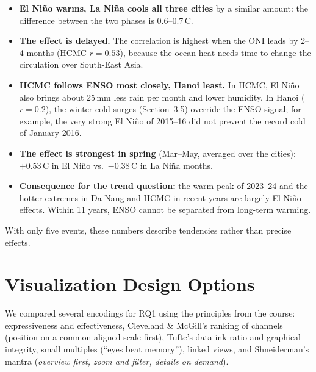 \documentclass[11pt,a4paper]{article}
\begin{document}
\begin{itemize}
    \item \textbf{El Niño warms, La Niña cools all three cities} by a similar amount: the difference between the two phases is 0.6--0.7\,\textdegree C.
    \item \textbf{The effect is delayed.} The correlation is highest when the ONI leads by 2--4 months (HCMC $r=0.53$), because the ocean
    heat needs time to change the circulation over South-East Asia.
    \item \textbf{HCMC follows ENSO most closely, Hanoi least.} In HCMC, El Niño also brings about 25\,mm less rain per month and lower
    humidity. In Hanoi ($r=0.2$), the winter cold surges (Section~3.5) override the ENSO signal; for example, the very strong El Niño of 2015--16
    did not prevent the record cold of January 2016.
    \item \textbf{The effect is strongest in spring} (Mar--May, averaged over the cities): $+0.53$\,\textdegree C in El Niño vs.\ $-0.38$\,\textdegree C in La Niña months.
    \item \textbf{Consequence for the trend question:} the warm peak of 2023--24 and the hotter extremes in Da Nang and HCMC in recent years
    are largely El Niño effects. Within 11 years, ENSO cannot be separated from long-term warming.
\end{itemize}
With only five events, these numbers describe tendencies rather than precise effects.

\section{Visualization Design Options}
We compared several encodings for RQ1 using the principles from the course:
expressiveness and effectiveness, Cleveland \& McGill's ranking of channels (position on a common aligned scale first),
Tufte's data-ink ratio and graphical integrity, small multiples (``eyes beat memory''),
linked views, and Shneiderman's mantra (\emph{overview first, zoom and filter, details on demand}).
\end{document}
